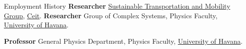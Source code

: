 \begin{rubric}{Employment History}
%
	\textbf{Researcher} \href{https://www.ceit.es/en/areas-of-r-a-d/transportation-and-energy/transportation-and-sustainable-mobility}{Sustainable Transportation and Mobility Group}, \href{https://www.ceit.es/}{Ceit}.
%
%
\entry*[2020 -- 2023]%
	\textbf{Researcher} Group of Complex Systems, Physics Faculty, \href{https://uh.cu/}{University of Havana}.

    \textbf{Professor}  General Physics Department, Physics Faculty, \href{https://uh.cu/}{University of Havana}.
%
\end{rubric}